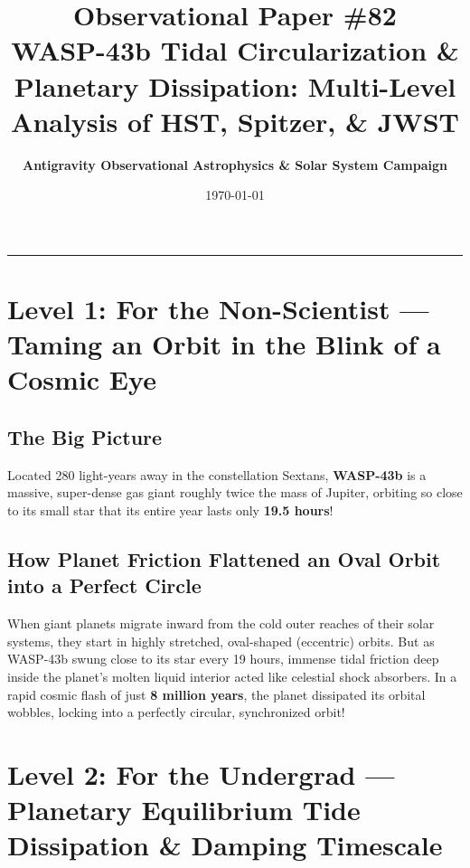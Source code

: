 \documentclass[11pt,a4paper]{article}
\title{\Huge \textbf{Observational Paper \#82}\\ \Large WASP-43b Tidal Circularization \& Planetary Dissipation: Multi-Level Analysis of HST, Spitzer, \& JWST}
\author{\textbf{Antigravity Observational Astrophysics \& Solar System Campaign}}
\date{\today}
\begin{document}
\maketitle

\vspace{-1em}
\begin{center}
\rule{\textwidth}{1.5pt}
\end{center}

\section*{Level 1: For the Non-Scientist — Taming an Orbit in the Blink of a Cosmic Eye}

\subsection*{The Big Picture}
Located 280 light-years away in the constellation Sextans, \textbf{WASP-43b} is a massive, super-dense gas giant roughly twice the mass of Jupiter, orbiting so close to its small star that its entire year lasts only \textbf{19.5 hours}!

\subsection*{How Planet Friction Flattened an Oval Orbit into a Perfect Circle}
When giant planets migrate inward from the cold outer reaches of their solar systems, they start in highly stretched, oval-shaped (eccentric) orbits. But as WASP-43b swung close to its star every 19 hours, immense tidal friction deep inside the planet's molten liquid interior acted like celestial shock absorbers. In a rapid cosmic flash of just \textbf{8 million years}, the planet dissipated its orbital wobbles, locking into a perfectly circular, synchronized orbit!

\newpage

\section*{Level 2: For the Undergrad — Planetary Equilibrium Tide Dissipation \& Damping Timescale}
\end{document}
